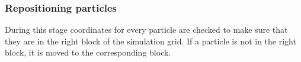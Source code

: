 \subsubsection{Repositioning particles}

During this stage coordinates for every particle are checked to make sure that
they are in the right block of the simulation grid. If a particle is not in the
right block, it is moved to the corresponding block.
